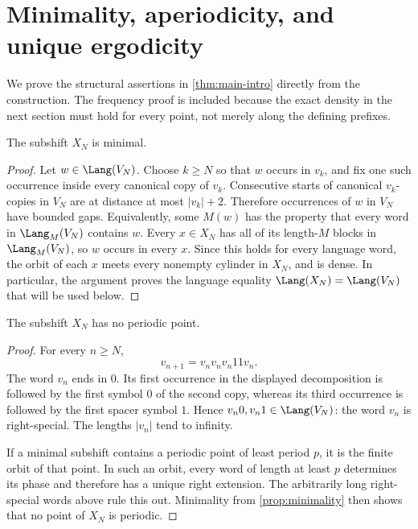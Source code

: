 \section{Minimality, aperiodicity, and unique ergodicity}

We prove the structural assertions in \cref{thm:main-intro} directly from the
construction.  The frequency proof is included because the exact density in
the next section must hold for every point, not merely along the defining
prefixes.

\begin{proposition}[minimality]\label{prop:minimality}
The subshift $X_N$ is minimal.
\end{proposition}

\begin{proof}
Let $w\in\Lang(V_N)$.  Choose $k\geq N$ so that $w$ occurs in $v_k$, and fix
one such occurrence inside every canonical copy of $v_k$.  Consecutive starts
of canonical $v_k$-copies in $V_N$ are at distance at most $|v_k|+2$.
Therefore occurrences of $w$ in $V_N$ have bounded gaps.  Equivalently, some
$M(w)$ has the property that every word in $\Lang_M(V_N)$ contains $w$.
Every $x\in X_N$ has all of its length-$M$ blocks in $\Lang_M(V_N)$, so $w$
occurs in every $x$.  Since this holds for every language word, the orbit of
each $x$ meets every nonempty cylinder in $X_N$, and is dense.
In particular, the argument proves the language equality
$\Lang(X_N)=\Lang(V_N)$ that will be used below.
\end{proof}

\begin{proposition}[aperiodicity]\label{prop:aperiodicity}
The subshift $X_N$ has no periodic point.
\end{proposition}

\begin{proof}
For every $n\geq N$,
\[
 v_{n+1}=v_nv_nv_n11v_n.
\]
The word $v_n$ ends in $0$.  Its first occurrence in the displayed
decomposition is followed by the first symbol $0$ of the second copy, whereas
its third occurrence is followed by the first spacer symbol $1$.  Hence
$v_n0,v_n1\in\Lang(V_N)$: the word $v_n$ is right-special.  The lengths
$|v_n|$ tend to infinity.

If a minimal subshift contains a periodic point of least period $p$, it is the
finite orbit of that point.  In such an orbit, every word of length at least
$p$ determines its phase and therefore has a unique right extension.  The
arbitrarily long right-special words above rule this out.  Minimality from
\cref{prop:minimality} then shows that no point of $X_N$ is periodic.
\end{proof}

